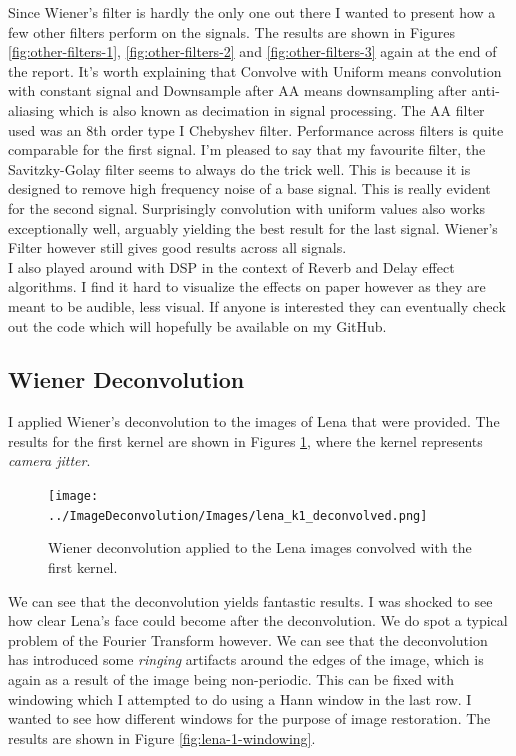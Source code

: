 \documentclass[10pt, titlepage, a4paper]{article}
\begin{document}
Since Wiener's filter is hardly the only one out there I wanted to present how a few other filters perform on the signals. The results are shown in Figures \ref{fig:other-filters-1},
\ref{fig:other-filters-2} and \ref{fig:other-filters-3} again at the end of the report. It's worth explaining that Convolve 
with Uniform means convolution with constant signal and Downsample after AA means downsampling after anti-aliasing which is also 
known as decimation in signal processing. The AA filter used was an 8th order type I Chebyshev filter. Performance across filters 
is quite comparable for the first signal. I'm pleased to say that my favourite filter, the Savitzky-Golay filter seems to 
always do the trick well. This is because it is designed to remove high frequency noise of a base signal. This is really evident 
for the second signal. Surprisingly convolution with uniform values also works exceptionally well, arguably yielding the 
best result for the last signal. Wiener's Filter however still gives good results across all signals. \\


I also played around with DSP in the context of Reverb and Delay effect algorithms. I find it hard to visualize the effects on 
paper however as they are meant to be audible, less visual. If anyone is interested they can eventually check out the code 
which will hopefully be available on my GitHub. \\

\subsection{Wiener Deconvolution}
I applied Wiener's deconvolution to the images of Lena that were provided. The results for the first kernel are 
shown in Figures \ref{fig:lena-1}, where the kernel represents \textit{camera jitter}.

\begin{figure}[H]
    \centering
    \texttt{[image: ../ImageDeconvolution/Images/lena\_k1\_deconvolved.png]}
    \caption{Wiener deconvolution applied to the Lena images convolved with the first kernel.}
    \label{fig:lena-1}
\end{figure}

We can see that the deconvolution yields fantastic results. I was shocked to see how clear Lena's face could become after 
the deconvolution. We do spot a typical problem of the Fourier Transform however. We can see that the deconvolution has
introduced some \textit{ringing} artifacts around the edges of the image, which is again as a result of the image being 
non-periodic. This can be fixed with windowing which I attempted to do using a Hann window in the last row. I wanted to see 
how different windows for the purpose of image restoration. The results are shown in Figure \ref{fig:lena-1-windowing}.
\end{document}
